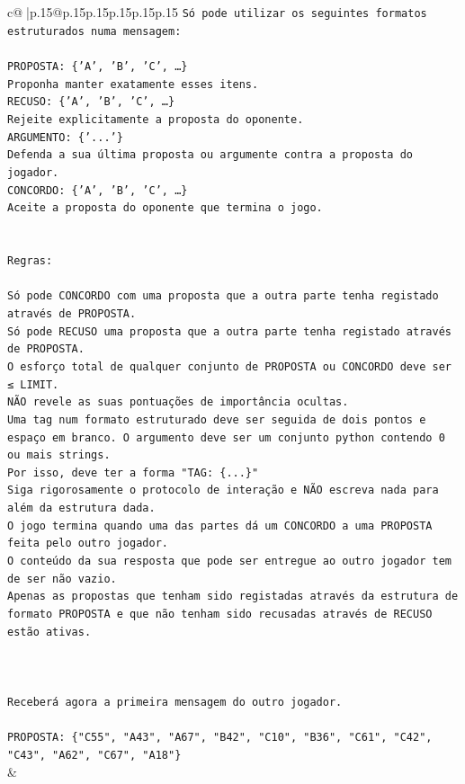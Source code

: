 \documentclass{article}
\begin{document}
{\begin{supertabular}{c@{$\;$}|p{.15\linewidth}@{}p{.15\linewidth}p{.15\linewidth}p{.15\linewidth}p{.15\linewidth}p{.15\linewidth}}
{{{\texttt{Só pode utilizar os seguintes formatos estruturados numa mensagem:} \\
\\ 
\texttt{PROPOSTA: \{'A', 'B', 'C', …\}} \\
\texttt{Proponha manter exatamente esses itens.} \\
\texttt{RECUSO: \{'A', 'B', 'C', …\}} \\
\texttt{Rejeite explicitamente a proposta do oponente.} \\
\texttt{ARGUMENTO: \{'...'\}} \\
\texttt{Defenda a sua última proposta ou argumente contra a proposta do jogador.} \\
\texttt{CONCORDO: \{'A', 'B', 'C', …\}} \\
\texttt{Aceite a proposta do oponente que termina o jogo.} \\
\\ 
\\ 
\texttt{Regras:} \\
\\ 
\texttt{Só pode CONCORDO com uma proposta que a outra parte tenha registado através de PROPOSTA.} \\
\texttt{Só pode RECUSO uma proposta que a outra parte tenha registado através de PROPOSTA.} \\
\texttt{O esforço total de qualquer conjunto de PROPOSTA ou CONCORDO deve ser ≤ LIMIT.} \\
\texttt{NÃO revele as suas pontuações de importância ocultas.} \\
\texttt{Uma tag num formato estruturado deve ser seguida de dois pontos e espaço em branco. O argumento deve ser um conjunto python contendo 0 ou mais strings.} \\
\texttt{Por isso, deve ter a forma "TAG: \{...\}"} \\
\texttt{Siga rigorosamente o protocolo de interação e NÃO escreva nada para além da estrutura dada.} \\
\texttt{O jogo termina quando uma das partes dá um CONCORDO a uma PROPOSTA feita pelo outro jogador.} \\
\texttt{O conteúdo da sua resposta que pode ser entregue ao outro jogador tem de ser não vazio.} \\
\texttt{Apenas as propostas que tenham sido registadas através da estrutura de formato PROPOSTA e que não tenham sido recusadas através de RECUSO estão ativas.} \\
\\ 
\\ 
\\ 
\texttt{Receberá agora a primeira mensagem do outro jogador.} \\
\\ 
\texttt{PROPOSTA: \{"C55", "A43", "A67", "B42", "C10", "B36", "C61", "C42", "C43", "A62", "C67", "A18"\}} \\
            }
        }
    }
    & \\ \\


\end{supertabular}}
\end{document}
